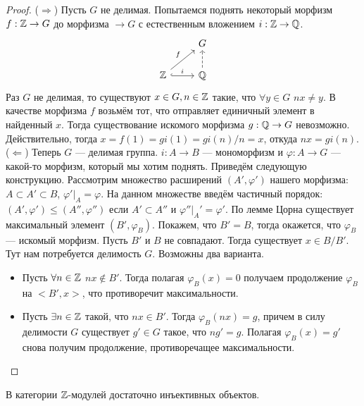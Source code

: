 \documentclass[../main.tex]{subfiles}
\begin{document}
\begin{proof}
($\Rightarrow$) Пусть $G$ не делимая. Попытаемся поднять некоторый морфизм $f:\mathbb{Z}\to G$ до морфизма $\!\to G$ с естественным вложением $i:\mathbb{Z} \to \mathbb{Q}$.
\begin{equation*}
\begin{tikzcd}
	& G \\
	\Z & \Q
	\arrow["i", hook, from=2-1, to=2-2]
	\arrow["f", from=2-1, to=1-2]
	\arrow[dashed, from=2-2, to=1-2]
\end{tikzcd}
\end{equation*}
Раз $G$ не делимая, то существуют $x \in G, n \in \mathbb{Z}$ такие, что $\forall y \in G$ $nx \ne y$. В качестве морфизма $f$ возьмём тот, что отправляет единичный элемент в найденный $x$. Тогда существование искомого морфизма $g:\mathbb{Q} \to G$ невозможно. Действительно, тогда $x = f(1) = gi(1) = gi(n)/n = x$, откуда $nx = gi(n)$.
($\Leftarrow$)
Теперь $G$ --- делимая группа. $i : A \to B$ --- мономорфизм и $\varphi: A\to G$ --- какой-то морфизм, который мы хотим поднять. Приведём следующую конструкцию. Рассмотрим множество расширений $(A', \varphi')$ нашего морфизма: $A \subset A' \subset B$, $\varphi'|_A = \varphi$. На данном множестве введём частичный порядок: $(A', \varphi') \le (A'', \varphi'')$ если $A'\subset A''$ и $\varphi''|_A' = \varphi'$. По лемме Цорна существует максимальный элемент $(B', \varphi_B)$. Покажем, что $B'=B$, тогда окажется, что $\varphi_B$ --- искомый морфизм.
Пусть $B'$ и $B$ не совпадают. Тогда существует $x\in B/B'$. Тут нам потребуется делимость $G$. Возможны два варианта.
\begin{itemize}
    \item Пусть $\forall n\in\mathbb{Z}$ $nx \notin B'$. Тогда полагая $\varphi_B(x) = 0$ получаем продолжение $\varphi_B$ на $<B', x>$, что противоречит максимальности.
    \item Пусть $\exists n\in \mathbb{Z}$ такой, что $nx\in B'$. Тогда $\varphi_B(nx) = g$, причем в силу делимости $G$ существует $g'\in G$ такое, что $ng' = g$. Полагая $\varphi_B(x) = g'$ снова получим продолжение, противоречащее максимальности.
\end{itemize}
\end{proof}
\begin{to_suj}
В категории $\mathbb{Z}$-модулей достаточно инъективных объектов.
\end{to_suj}
\end{document}
